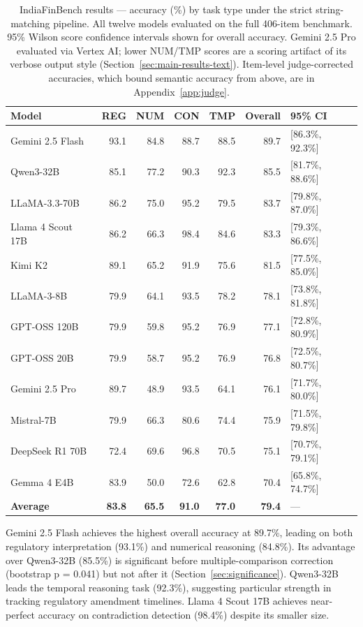 \documentclass[11pt]{article}
\begin{document}
\begin{table}[t]
\centering\small
\begin{tabular}{lrrrrrl}
\toprule
\textbf{Model} & \textbf{REG} & \textbf{NUM} & \textbf{CON} & \textbf{TMP} & \textbf{Overall} & \textbf{95\% CI} \\
\midrule
Gemini 2.5 Flash & 93.1 & 84.8 & 88.7 & 88.5 & 89.7 & [86.3\%, 92.3\%] \\
Qwen3-32B & 85.1 & 77.2 & 90.3 & 92.3 & 85.5 & [81.7\%, 88.6\%] \\
LLaMA-3.3-70B & 86.2 & 75.0 & 95.2 & 79.5 & 83.7 & [79.8\%, 87.0\%] \\
Llama 4 Scout 17B & 86.2 & 66.3 & 98.4 & 84.6 & 83.3 & [79.3\%, 86.6\%] \\
Kimi K2 & 89.1 & 65.2 & 91.9 & 75.6 & 81.5 & [77.5\%, 85.0\%] \\
LLaMA-3-8B & 79.9 & 64.1 & 93.5 & 78.2 & 78.1 & [73.8\%, 81.8\%] \\
GPT-OSS 120B & 79.9 & 59.8 & 95.2 & 76.9 & 77.1 & [72.8\%, 80.9\%] \\
GPT-OSS 20B & 79.9 & 58.7 & 95.2 & 76.9 & 76.8 & [72.5\%, 80.7\%] \\
Gemini 2.5 Pro\textdagger{} & 89.7 & 48.9 & 93.5 & 64.1 & 76.1 & [71.7\%, 80.0\%] \\
Mistral-7B & 79.9 & 66.3 & 80.6 & 74.4 & 75.9 & [71.5\%, 79.8\%] \\
DeepSeek R1 70B & 72.4 & 69.6 & 96.8 & 70.5 & 75.1 & [70.7\%, 79.1\%] \\
Gemma 4 E4B & 83.9 & 50.0 & 72.6 & 62.8 & 70.4 & [65.8\%, 74.7\%] \\
\midrule
\textbf{Average} & \textbf{83.8} & \textbf{65.5} & \textbf{91.0} & \textbf{77.0} & \textbf{79.4} & --- \\
\bottomrule
\end{tabular}
\caption{IndiaFinBench results --- accuracy (\%) by task type under the strict string-matching pipeline. All twelve models evaluated on the full 406-item benchmark. 95\% Wilson score \citep{wilson1927} confidence intervals shown for overall accuracy. \textdagger{}Gemini 2.5 Pro evaluated via Vertex AI; lower NUM/TMP scores are a scoring artifact of its verbose output style (Section~\ref{sec:main-results-text}). Item-level judge-corrected accuracies, which bound semantic accuracy from above, are in Appendix~\ref{app:judge}.}
\label{tab:mainresults}
\end{table}

\label{sec:main-results-text}
Gemini 2.5 Flash achieves the highest overall accuracy at 89.7\%, leading on both regulatory interpretation (93.1\%) and numerical reasoning (84.8\%). Its advantage over Qwen3-32B (85.5\%) is significant before multiple-comparison correction (bootstrap p = 0.041) but not after it (Section~\ref{sec:significance}). Qwen3-32B leads the temporal reasoning task (92.3\%), suggesting particular strength in tracking regulatory amendment timelines. Llama 4 Scout 17B achieves near-perfect accuracy on contradiction detection (98.4\%) despite its smaller size.
\end{document}
